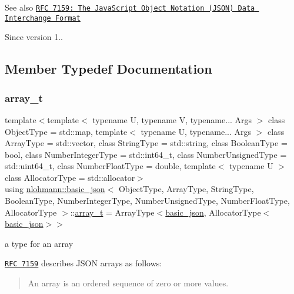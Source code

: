 \begin{DoxySeeAlso}{See also}
\href{http://rfc7159.net/rfc7159}{\tt R\+FC 7159\+: The Java\+Script Object Notation (J\+S\+ON) Data Interchange Format}
\end{DoxySeeAlso}
\begin{DoxySince}{Since}
version 1.. 
\end{DoxySince}


\subsection{Member Typedef Documentation}
\hypertarget{classnlohmann_1_1basic__json_ab00b882d39306d663c23dab110f5cae0}{}\label{classnlohmann_1_1basic__json_ab00b882d39306d663c23dab110f5cae0} 
\subsubsection{\texorpdfstring{array\+\_\+t}{array\_t}}
{\footnotesize\ttfamily template$<$template$<$ typename U, typename V, typename... Args $>$ class Object\+Type = std\+::map, template$<$ typename U, typename... Args $>$ class Array\+Type = std\+::vector, class String\+Type  = std\+::string, class Boolean\+Type  = bool, class Number\+Integer\+Type  = std\+::int64\+\_\+t, class Number\+Unsigned\+Type  = std\+::uint64\+\_\+t, class Number\+Float\+Type  = double, template$<$ typename U $>$ class Allocator\+Type = std\+::allocator$>$ \\
using \hyperlink{classnlohmann_1_1basic__json}{nlohmann\+::basic\+\_\+json}$<$ Object\+Type, Array\+Type, String\+Type, Boolean\+Type, Number\+Integer\+Type, Number\+Unsigned\+Type, Number\+Float\+Type, Allocator\+Type $>$\+::\hyperlink{classnlohmann_1_1basic__json_ab00b882d39306d663c23dab110f5cae0}{array\+\_\+t} =  Array\+Type$<$\hyperlink{classnlohmann_1_1basic__json}{basic\+\_\+json}, Allocator\+Type$<$\hyperlink{classnlohmann_1_1basic__json}{basic\+\_\+json}$>$$>$}



a type for an array 

\href{http://rfc7159.net/rfc7159}{\tt R\+FC 7159} describes J\+S\+ON arrays as follows\+: \begin{quote}
An array is an ordered sequence of zero or more values. \end{quote}


